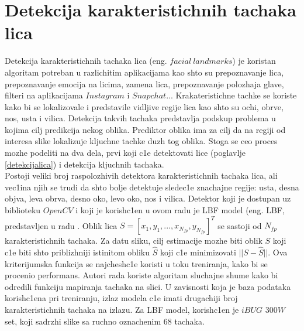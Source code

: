 \documentclass[a4paper, openany, oneside, 11pt]{book}
\begin{document}
\section{Detekcija karakteristichnih tachaka lica}
Detekcija karakteristichnih tachaka lica (eng. $facial\ landmarks$) je koristan algoritam potreban u razlichitim aplikacijama kao shto su prepoznavanje lica, prepoznavanje emocija na licima, zamena lica, prepoznavanje polozhaja glave, filteri na aplikacijama $Instagram$ i $Snapchat$... Krakateristichne tachke se koriste kako bi se lokalizovale i predstavile vidljive regije lica kao shto su ochi, obrve, nos, usta i vilica. Detekcija takvih tachaka predstavlja podskup problema u kojima cilj predikcija nekog oblika. Prediktor oblika ima za cilj da na regiji od interesa slike lokalizuje kljuchne tachke duzh tog oblika. Stoga se ceo proces mozhe podeliti na dva dela, prvi koji c1e detektovati lice (poglavlje \ref{detekcijalica}) i detekcija kljuchnih tachaka.\\
Postoji veliki broj raspolozhivih detektora karakteristichnih tachaka lica, ali vec1ina njih se trudi da shto bolje detektuje sledec1e znachajne regije: usta, desna objva, leva obrva, desno oko, levo oko, nos i vilica. Detektor koji je dostupan uz biblioteku $OpenCV$ i koji je korish\-c1en u ovom radu je \acrshort{LBF} model (eng. \acrlong{LBF}, predstavljen u radu \cite{LBF}. Oblik lica $S=[x_1, y_1,...,x_{N_{fp}},y_{N_{fp}}]^T$ se sastoji od $N_{fp}$ karakteristichnih tachaka. Za datu sliku, cilj estimacije mozhe biti oblik $S$ koji c1e biti shto priblizhniji istinitom obliku $\hat{S}$ koji c1e minimizovati $||S-\hat{S}||$. Ova kriterijumska funkcija se najchesh\-c1e koristi u toku treniranja, kako bi se procenio performans. Autori rada \cite{LBF} koriste algoritam sluchajne shume kako bi odredili funkciju mapiranja tachaka na slici.
U zavisnosti koja je baza podataka korish\-c1ena pri treniranju, izlaz modela c1e imati drugachiji broj karakteristichnih tachaka na izlazu. Za \acrshort{LBF} model, korish\-c1en je $iBUG$ $300W$ set, koji sadrzhi slike sa ruchno oznachenim 68 tachaka.
\end{document}
